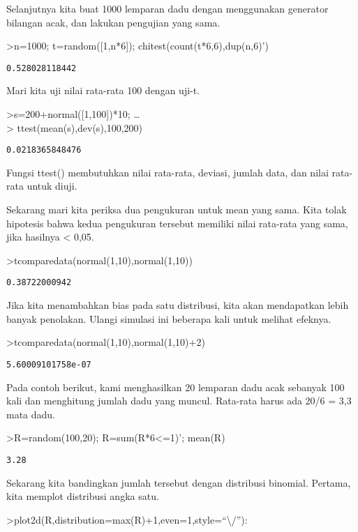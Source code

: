 \documentclass[
]{book}
\begin{document}
Selanjutnya kita buat 1000 lemparan dadu dengan menggunakan generator bilangan acak, dan lakukan pengujian yang sama.

\textgreater n=1000; t=random({[}1,n*6{]}); chitest(count(t*6,6),dup(n,6)')

\begin{verbatim}
0.528028118442
\end{verbatim}

Mari kita uji nilai rata-rata 100 dengan uji-t.

\textgreater s=200+normal({[}1,100{]})*10; \ldots{}\\
\textgreater{} ttest(mean(s),dev(s),100,200)

\begin{verbatim}
0.0218365848476
\end{verbatim}

Fungsi ttest() membutuhkan nilai rata-rata, deviasi, jumlah data, dan nilai rata-rata untuk diuji.

Sekarang mari kita periksa dua pengukuran untuk mean yang sama. Kita tolak hipotesis bahwa kedua pengukuran tersebut memiliki nilai rata-rata yang sama, jika hasilnya \textless{} 0,05.

\textgreater tcomparedata(normal(1,10),normal(1,10))

\begin{verbatim}
0.38722000942
\end{verbatim}

Jika kita menambahkan bias pada satu distribusi, kita akan mendapatkan lebih banyak penolakan. Ulangi simulasi ini beberapa kali untuk melihat efeknya.

\textgreater tcomparedata(normal(1,10),normal(1,10)+2)

\begin{verbatim}
5.60009101758e-07
\end{verbatim}

Pada contoh berikut, kami menghasilkan 20 lemparan dadu acak sebanyak 100 kali dan menghitung jumlah dadu yang muncul. Rata-rata harus ada 20/6 = 3,3 mata dadu.

\textgreater R=random(100,20); R=sum(R*6\textless=1)'; mean(R)

\begin{verbatim}
3.28
\end{verbatim}

Sekarang kita bandingkan jumlah tersebut dengan distribusi binomial. Pertama, kita memplot distribusi angka satu.

\textgreater plot2d(R,distribution=max(R)+1,even=1,style=``\textbackslash/''):
\end{document}
